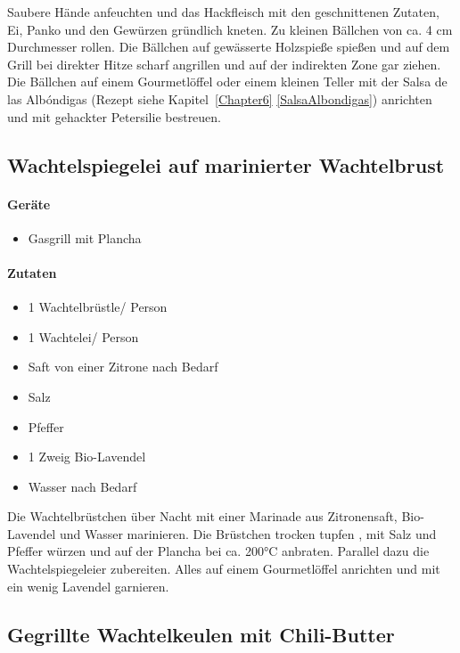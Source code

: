 Saubere Hände anfeuchten und das Hackfleisch mit den geschnittenen Zutaten, Ei, Panko und den Gewürzen gründlich kneten. Zu 
kleinen Bällchen von ca. 4 cm Durchmesser rollen.
Die Bällchen auf gewässerte Holzspieße spießen und auf dem Grill bei direkter Hitze scharf angrillen und auf der indirekten Zone gar 
ziehen. Die Bällchen auf einem Gourmetlöffel oder einem kleinen Teller mit der Salsa de las Albóndigas (Rezept siehe 
Kapitel~\ref{Chapter6} \vref{SalsaAlbondigas}) anrichten und mit gehackter Petersilie bestreuen.

\subsection{Wachtelspiegelei auf marinierter Wachtelbrust}

\paragraph{Geräte}

\begin{itemize}[noitemsep]
	\item Gasgrill mit Plancha
\end{itemize}
	
\paragraph{Zutaten}

\begin{itemize}[noitemsep]
	\item 1 Wachtelbrüstle/ Person
	\item 1 Wachtelei/ Person
	\item Saft von einer Zitrone nach Bedarf
	\item Salz
	\item Pfeffer
	\item 1 Zweig Bio-Lavendel
	\item Wasser nach Bedarf
\end{itemize}

Die Wachtelbrüstchen über Nacht mit einer Marinade aus Zitronensaft, Bio-Lavendel und Wasser marinieren. Die Brüstchen trocken tupfen , mit Salz und Pfeffer würzen und  auf der Plancha bei ca. 200°C anbraten. Parallel dazu die Wachtelspiegeleier zubereiten. Alles auf einem Gourmetlöffel anrichten und mit ein wenig Lavendel garnieren.

\subsection{ Gegrillte Wachtelkeulen mit Chili-Butter }

